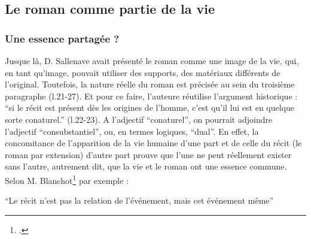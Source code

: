 \documentclass[a4paper,10pt]{article}
\begin{document}
		\subsection{Le roman comme partie de la vie}
			\subsubsection{Une essence partagée ?}\label{essencepartagee}
				Jusque là, D. Sallenave avait présenté le roman comme une image de la vie, qui, en tant qu'image, pouvait utiliser des supports, des matériaux différents de l'original. Toutefois, la nature réelle du roman est précisée au sein du troisième paragraphe (l.21-27). Et pour ce faire, l'auteure réutilise l'argument historique : ``si le récit est présent dès les origines de l'homme, c'est qu'il lui est en quelque sorte conaturel.'' (l.22-23). A l'adjectif ``conaturel'', on pourrait adjoindre l'adjectif ``consubstantiel'', ou, en termes logiques, ``dual''. En effet, la concomitance de l'apparition de la vie humaine d'une part et de celle du récit (le roman par extension) d'autre part prouve que l'une ne peut réellement exister sans l'autre, autrement dit, que la vie et le roman ont une essence commune. Selon M. Blanchot\footcite{Blanchot1959} par exemple :
				\begin{center}
					\footnotesize
					\begin{minipage}{0.7\textwidth}
						``Le récit n'est pas la relation de l'événement, mais cet événement même''
					\end{minipage}
				\end{center}
\end{document}
